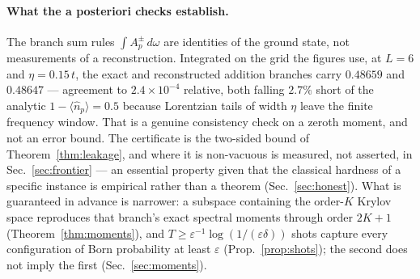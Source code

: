 \paragraph{What the a posteriori checks establish.} The branch sum rules $\int A_p^{\pm}\,d\omega$ are
identities of the ground state, not measurements of a reconstruction. Integrated on the grid the figures
use, at $L=6$ and $\eta=0.15\,t$, the exact and reconstructed addition branches carry $0.48659$ and
$0.48647$ --- agreement to $2.4\times10^{-4}$ relative, both falling $2.7\%$ short of the analytic
$1-\langle\hat n_p\rangle=0.5$ because Lorentzian tails of width $\eta$ leave the finite frequency
window. That is a genuine consistency check on a zeroth moment, and not an error bound. The certificate
is the two-sided bound of Theorem~\ref{thm:leakage}, and where it is non-vacuous is measured, not
asserted, in Sec.~\ref{sec:frontier} --- an essential property given that the classical hardness of a
specific instance is empirical rather than a theorem (Sec.~\ref{sec:honest}). What is guaranteed in advance is narrower: a subspace containing the order-$K$ Krylov space reproduces that branch's exact spectral moments through order $2K{+}1$ (Theorem~\ref{thm:moments}), and $T\ge\varepsilon^{-1}\log(1/(\varepsilon\delta))$ shots capture every configuration of Born probability at least $\varepsilon$ (Prop.~\ref{prop:shots}); the second does not imply the first (Sec.~\ref{sec:moments}).


